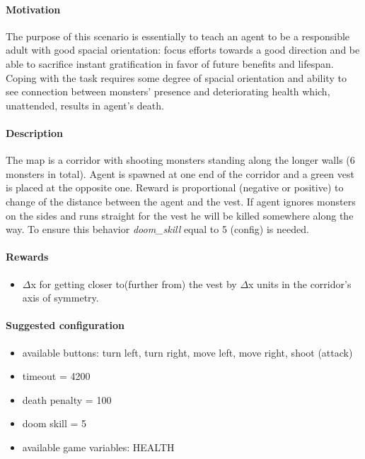 		\paragraph{Motivation} 
			The purpose of this scenario is essentially to teach an agent to be a responsible adult with good spacial orientation: focus efforts towards a good direction and be able to sacrifice instant gratification in favor of future benefits and lifespan. Coping with the task requires some degree of spacial orientation and ability to see connection between monsters' presence and deteriorating health which, unattended, results in agent's death.

		\paragraph{Description}
			The map is a corridor with shooting monsters standing along the longer walls (6 monsters in total). Agent is spawned at one end of the corridor and a green vest is placed at the opposite one. Reward is proportional (negative or positive) to change of the distance between the agent and the vest. If agent ignores monsters on the sides and runs straight for the vest he will be killed somewhere along the way. To ensure this behavior \textit{doom\_skill} equal to 5 (config) is needed.

		\paragraph{Rewards}
			\begin{itemize}
				\item $\Delta$x for getting closer to(further from) the vest by $\Delta$x units in the corridor's axis of symmetry.
			\end{itemize}
			
		\paragraph{Suggested configuration}
			\begin{itemize}
				\item available buttons: turn left, turn right, move left, move right, shoot (attack)
				\item timeout = 4200
				\item death penalty = 100
				\item doom skill = 5
				\item available game variables: HEALTH
			\end{itemize}
	\newpage

